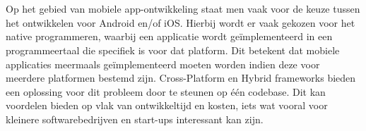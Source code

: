 
%
%
%
%
%

%



\chapter*{}

Op het gebied van mobiele app-ontwikkeling staat men vaak voor de keuze tussen het ontwikkelen voor Android en/of iOS. Hierbij wordt er vaak gekozen voor het native programmeren, waarbij een applicatie wordt geïmplementeerd in een programmeertaal die specifiek is voor dat platform. Dit betekent dat mobiele applicaties meermaals geïmplementeerd moeten worden indien deze voor meerdere platformen bestemd zijn. Cross-Platform en Hybrid frameworks bieden een oplossing voor dit probleem door te steunen op één codebase. Dit kan voordelen bieden op vlak van ontwikkeltijd en kosten, iets wat vooral voor kleinere softwarebedrijven en start-ups interessant kan zijn.


